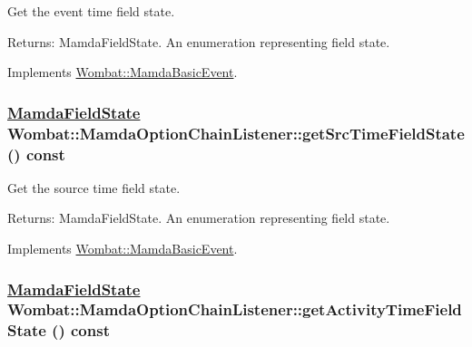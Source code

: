 Get the event time field state. 

\begin{Desc}
\item[Returns:]Mamda\-Field\-State. An enumeration representing field state. \end{Desc}


Implements \hyperlink{classWombat_1_1MamdaBasicEvent_ff3932065e16e660fb6cd9285b46f7d0}{Wombat::Mamda\-Basic\-Event}.\hypertarget{classWombat_1_1MamdaOptionChainListener_7f2c10954ad153ad4b6e051705fd60fe}{
\subsubsection[getSrcTimeFieldState]{\setlength{\rightskip}{0pt plus 5cm}\hyperlink{namespaceWombat_93aac974f2ab713554fd12a1fa3b7d2a}{Mamda\-Field\-State} Wombat::Mamda\-Option\-Chain\-Listener::get\-Src\-Time\-Field\-State () const}}
\label{classWombat_1_1MamdaOptionChainListener_7f2c10954ad153ad4b6e051705fd60fe}


Get the source time field state. 

\begin{Desc}
\item[Returns:]Mamda\-Field\-State. An enumeration representing field state. \end{Desc}


Implements \hyperlink{classWombat_1_1MamdaBasicEvent_9cd58f3d7b5ebea42fa86e5dde46ab18}{Wombat::Mamda\-Basic\-Event}.\hypertarget{classWombat_1_1MamdaOptionChainListener_2d0bea759653d2e73734d2fbfd01574a}{
\subsubsection[getActivityTimeFieldState]{\setlength{\rightskip}{0pt plus 5cm}\hyperlink{namespaceWombat_93aac974f2ab713554fd12a1fa3b7d2a}{Mamda\-Field\-State} Wombat::Mamda\-Option\-Chain\-Listener::get\-Activity\-Time\-Field\-State () const}}
\label{classWombat_1_1MamdaOptionChainListener_2d0bea759653d2e73734d2fbfd01574a}


